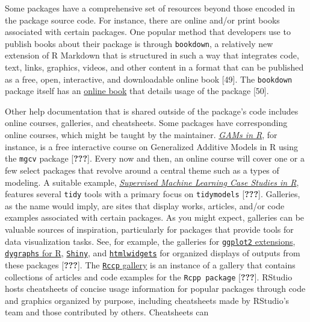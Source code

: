 \documentclass[10pt,letterpaper]{article}
\begin{document}
Some packages have a comprehensive set of resources beyond those encoded
in the package source code. For instance, there are online and/or print
books associated with certain packages. One popular method that
developers use to publish books about their package is through
\texttt{bookdown}, a relatively new extension of R Markdown that is
structured in such a way that integrates code, text, links, graphics,
videos, and other content in a format that can be published as a free,
open, interactive, and downloadable online book {[}49{]}. The
\texttt{bookdown} package itself has an
\href{https://bookdown.org/yihui/bookdown/}{online book} that details
usage of the package {[}50{]}.

Other help documentation that is shared outside of the package's code
includes online courses, galleries, and cheatsheets. Some packages have
corresponding online courses, which might be taught by the maintainer.
\href{https://noamross.github.io/gams-in-r-course/}{\emph{GAMs in R}},
for instance, is a free interactive course on Generalized Additive
Models in R using the \texttt{mgcv} package {[}{\textbf{???}}{]}. Every
now and then, an online course will cover one or a few select packages
that revolve around a central theme such as a types of modeling. A
suitable example,
\href{https://supervised-ml-course.netlify.app/}{\emph{Supervised
Machine Learning Case Studies in R}}, features several \texttt{tidy}
tools with a primary focus on \texttt{tidymodels} {[}{\textbf{???}}{]}.
Galleries, as the name would imply, are sites that display works,
articles, and/or code examples associated with certain packages. As you
might expect, galleries can be valuable sources of inspiration,
particularly for packages that provide tools for data visualization
tasks. See, for example, the galleries for
\href{https://exts.ggplot2.tidyverse.org/gallery/}{\texttt{ggplot2}
extensions},
\href{https://rstudio.github.io/dygraphs/index.html}{\texttt{dygraphs}
for R}, \href{https://shiny.rstudio.com/gallery/}{\texttt{Shiny}}, and
\href{https://gallery.htmlwidgets.org/}{\texttt{htmlwidgets}} for
organized displays of outputs from these packages {[}{\textbf{???}}{]}.
The \href{https://gallery.rcpp.org/}{\texttt{Rccp} gallery} is an
instance of a gallery that contains collections of articles and code
examples for the \texttt{Rcpp\ package} {[}{\textbf{???}}{]}. RStudio
hosts cheatsheets of concise usage information for popular packages
through code and graphics organized by purpose, including cheatsheets
made by RStudio's team and those contributed by others. Cheatsheets can
\end{document}
